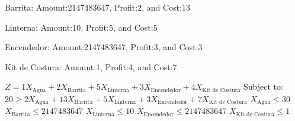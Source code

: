 \documentclass{article}
\begin{document}
Barrita: Amount:2147483647, Profit:2, and Cost:13

Linterna: Amount:10, Profit:5, and Cost:5

Encendedor: Amount:2147483647, Profit:3, and Cost:3

Kit de Costura: Amount:1, Profit:4, and Cost:7

$Z = 1X_{\text{Agua}} + 2X_{\text{Barrita}} + 5X_{\text{Linterna}} + 3X_{\text{Encendedor}} + 4X_{\text{Kit de Costura}}$
Subject to:
\bullet $20 \geq 2X_{\text{Agua}} + 13X_{\text{Barrita}} + 5X_{\text{Linterna}} + 3X_{\text{Encendedor}} + 7X_{\text{Kit de Costura}}$
\bullet $X_{\text{Agua}} \leq 30$
\bullet $X_{\text{Barrita}} \leq 2147483647$
\bullet $X_{\text{Linterna}} \leq 10$
\bullet $X_{\text{Encendedor}} \leq 2147483647$
\bullet $X_{\text{Kit de Costura}} \leq 1$
\end{document}
